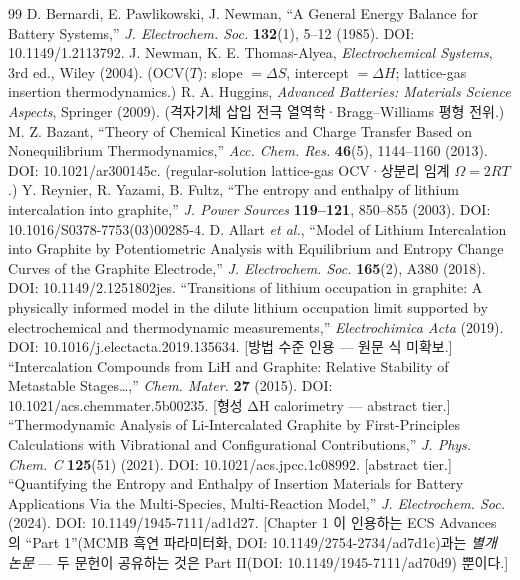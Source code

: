 \documentclass[11pt,a4paper]{article}
\begin{document}
\begin{thebibliography}{99}
 D. Bernardi, E. Pawlikowski, J. Newman, ``A General Energy Balance for Battery Systems,'' \emph{J. Electrochem. Soc.} \textbf{132}(1), 5--12 (1985). DOI: 10.1149/1.2113792.
 J. Newman, K. E. Thomas-Alyea, \emph{Electrochemical Systems}, 3rd ed., Wiley (2004). (OCV($T$): slope $=\Delta S$, intercept $=\Delta H$; lattice-gas insertion thermodynamics.)
 R. A. Huggins, \emph{Advanced Batteries: Materials Science Aspects}, Springer (2009). (격자기체 삽입 전극 열역학·Bragg--Williams 평형 전위.)
 M. Z. Bazant, ``Theory of Chemical Kinetics and Charge Transfer Based on Nonequilibrium Thermodynamics,'' \emph{Acc. Chem. Res.} \textbf{46}(5), 1144--1160 (2013). DOI: 10.1021/ar300145c. (regular-solution lattice-gas OCV·상분리 임계 $\Omega=2RT$.)
 Y. Reynier, R. Yazami, B. Fultz, ``The entropy and enthalpy of lithium intercalation into graphite,'' \emph{J. Power Sources} \textbf{119--121}, 850--855 (2003). DOI: 10.1016/S0378-7753(03)00285-4.
 D. Allart \emph{et al.}, ``Model of Lithium Intercalation into Graphite by Potentiometric Analysis with Equilibrium and Entropy Change Curves of the Graphite Electrode,'' \emph{J. Electrochem. Soc.} \textbf{165}(2), A380 (2018). DOI: 10.1149/2.1251802jes.
 ``Transitions of lithium occupation in graphite: A physically informed model in the dilute lithium occupation limit supported by electrochemical and thermodynamic measurements,'' \emph{Electrochimica Acta} (2019). DOI: 10.1016/j.electacta.2019.135634. [방법 수준 인용 — 원문 식 미확보.]
 ``Intercalation Compounds from LiH and Graphite: Relative Stability of Metastable Stages\ldots,'' \emph{Chem. Mater.} \textbf{27} (2015). DOI: 10.1021/acs.chemmater.5b00235. [형성 ΔH calorimetry — abstract tier.]
 ``Thermodynamic Analysis of Li-Intercalated Graphite by First-Principles Calculations with Vibrational and Configurational Contributions,'' \emph{J. Phys. Chem. C} \textbf{125}(51) (2021). DOI: 10.1021/acs.jpcc.1c08992. [abstract tier.]
 ``Quantifying the Entropy and Enthalpy of Insertion Materials for Battery Applications Via the Multi-Species, Multi-Reaction Model,'' \emph{J. Electrochem. Soc.} (2024). DOI: 10.1149/1945-7111/ad1d27. [Chapter 1 이 인용하는 ECS Advances 의 ``Part 1''(MCMB 흑연 파라미터화, DOI: 10.1149/2754-2734/ad7d1c)과는 \emph{별개 논문} — 두 문헌이 공유하는 것은 Part II(DOI: 10.1149/1945-7111/ad70d9) 뿐이다.]

\end{thebibliography}
\end{document}
